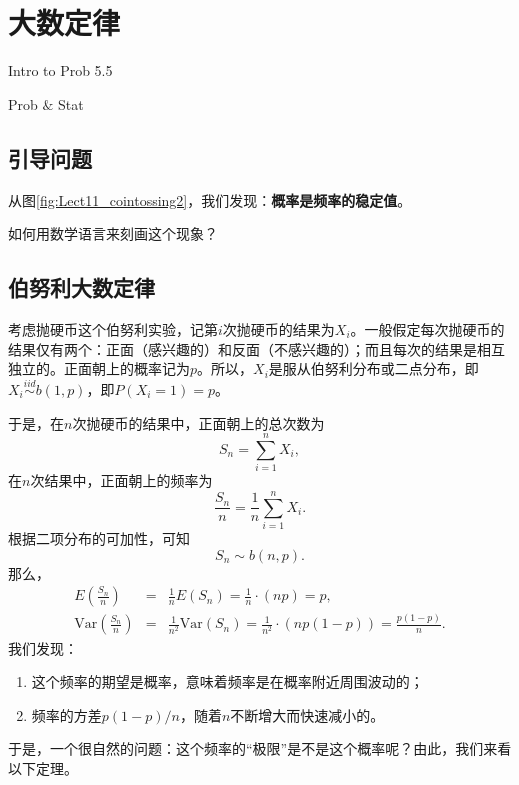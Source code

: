 \chapter{大数定律}
\begin{introduction}
  \item Intro to Prob 5.5
  \item Prob $\&$ Stat
\end{introduction}

\section{引导问题}
从图\ref{fig:Lect11_cointossing2}，我们发现：\textbf{概率是频率的稳定值}。

\begin{problem}
   如何用数学语言来刻画这个现象？
\end{problem}

\section{伯努利大数定律}
考虑抛硬币这个伯努利实验，记第$i$次抛硬币的结果为$X_{i}$。一般假定每次抛硬币的结果仅有两个：正面（感兴趣的）和反面（不感兴趣的）；而且每次的结果是相互独立的。正面朝上的概率记为$p$。所以，$X_i$是服从伯努利分布或二点分布，即$X_i\overset{iid}{\sim} b(1,p)$，即$P(X_{i}=1)=p$。

于是，在$n$次抛硬币的结果中，正面朝上的总次数为
$$S_{n}=\sum_{i=1}^{n}X_{i},$$
在$n$次结果中，正面朝上的频率为$$\frac{S_{n}}{n}=\frac{1}{n}\sum_{i=1}^{n}  X_{i}.$$
根据二项分布的可加性，可知
$$S_{n}\sim b(n,p).$$
那么，
\begin{eqnarray*}
E\left(\frac{S_{n}}{n}\right) &=& \frac{1}{n} E(S_{n})=\frac{1}{n}\cdot (np)=p, \\
\text{Var}\left(\frac{S_{n}}{n}\right) &=& \frac{1}{n^{2}}\text{Var}(S_{n})=\frac{1}{n^{2}}\cdot (np(1-p))=\frac{p(1-p)}{n} .
\end{eqnarray*}
我们发现：
\begin{enumerate}
    \item 这个频率的期望是概率，意味着频率是在概率附近周围波动的；
    \item 频率的方差$p(1-p)/n$，随着$n$不断增大而快速减小的。
\end{enumerate}

于是，一个很自然的问题：这个频率的“极限”是不是这个概率呢？由此，我们来看以下定理。


